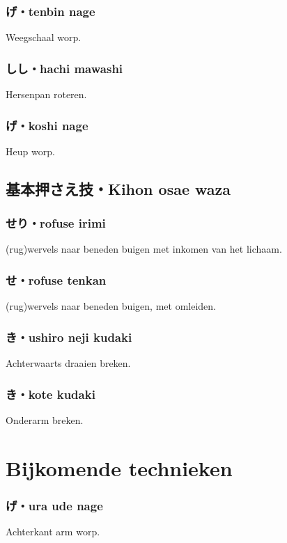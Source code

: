 \subsubsection{げ・tenbin nage}
Weegschaal worp.

\subsubsection{しし・hachi mawashi}
Hersenpan roteren.

\subsubsection{げ・koshi nage}
Heup worp.

\subsection{基本押さえ技・Kihon osae waza}
\subsubsection{せり・rofuse irimi}
(rug)wervels naar beneden buigen met inkomen van het lichaam.

\subsubsection{せ・rofuse tenkan}
(rug)wervels naar beneden buigen, met omleiden.

\subsubsection{き・ushiro neji kudaki}
Achterwaarts draaien breken.

\subsubsection{き・kote kudaki}
Onderarm breken.

\section{Bijkomende technieken}
\subsubsection{げ・ura ude nage}
Achterkant arm worp.

